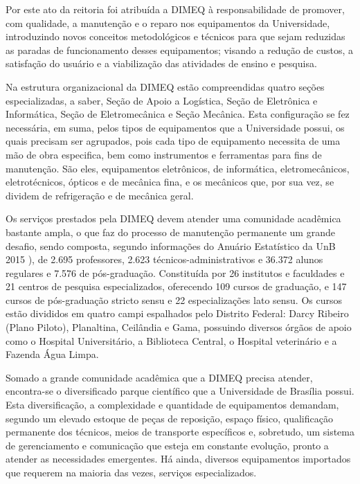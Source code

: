 Por este ato da reitoria foi atribuída a DIMEQ à responsabilidade de promover, com qualidade, a manutenção e o reparo nos equipamentos da Universidade, introduzindo novos conceitos metodológicos e técnicos para que sejam reduzidas as paradas de funcionamento desses equipamentos; visando a redução de custos, a satisfação do usuário e a viabilização das atividades de ensino e pesquisa.

Na estrutura organizacional da DIMEQ estão compreendidas quatro seções especializadas, a saber, Seção de Apoio a Logística, Seção de Eletrônica e Informática, Seção de Eletromecânica e Seção Mecânica. Esta configuração se fez necessária, em suma, pelos tipos de equipamentos que a Universidade possui, os quais precisam ser agrupados, pois cada tipo de equipamento necessita de uma mão de obra especifica, bem como instrumentos e ferramentas para fins de manutenção. São eles, equipamentos eletrônicos, de informática, eletromecânicos, eletrotécnicos, ópticos e de mecânica fina, e os mecânicos que, por sua vez, se dividem de refrigeração e de mecânica geral.

Os serviços prestados pela DIMEQ devem atender uma comunidade acadêmica bastante ampla, o que faz do processo de manutenção permanente um grande desafio, sendo composta, segundo informações do Anuário Estatístico da UnB 2015 \cite{anuario2015}), de 2.695 professores, 2.623 técnicos-administrativos e 36.372 alunos regulares e 7.576 de pós-graduação. Constituída por 26 institutos e faculdades e 21 centros de pesquisa especializados, oferecendo 109 cursos de graduação, e 147 cursos de pós-graduação stricto sensu e 22 especializações lato sensu. Os cursos estão divididos em quatro campi espalhados pelo Distrito Federal: Darcy Ribeiro (Plano Piloto), Planaltina, Ceilândia e Gama, possuindo diversos órgãos de apoio como o Hospital Universitário, a Biblioteca Central, o Hospital veterinário e a Fazenda Água Limpa.

Somado a grande comunidade acadêmica que a DIMEQ precisa atender, encontra-se o diversificado parque científico que a Universidade de Brasília possui. Esta diversificação, a complexidade e quantidade de equipamentos demandam, segundo \cite{limacastilho2006} um elevado estoque de peças de reposição, espaço físico, qualificação permanente dos técnicos, meios de transporte específicos e, sobretudo, um sistema de gerenciamento e comunicação que esteja em constante evolução, pronto a atender as necessidades emergentes. Há ainda, diversos equipamentos importados que requerem na maioria das vezes, serviços especializados.


